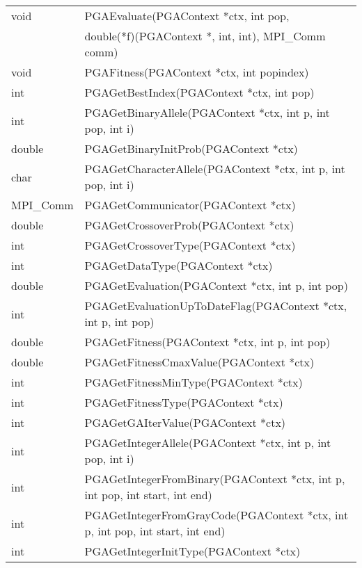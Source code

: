 \documentclass{report}
\begin{document}
\begin{tabular}{|l|l|}
void &  PGAEvaluate(PGAContext *ctx, int pop, \\ 
     & double(*f)(PGAContext *, int, int), MPI\_Comm comm) \\ \hline
void &  PGAFitness(PGAContext *ctx, int popindex) \\ \hline
int &  PGAGetBestIndex(PGAContext *ctx, int pop) \\ \hline
int &  PGAGetBinaryAllele(PGAContext *ctx, int p, int pop, int i) \\ \hline
double &  PGAGetBinaryInitProb(PGAContext *ctx) \\ \hline
char &  PGAGetCharacterAllele(PGAContext *ctx, int p, int pop, int i) \\ \hline
MPI\_Comm & PGAGetCommunicator(PGAContext *ctx) \\ \hline
double &  PGAGetCrossoverProb(PGAContext *ctx) \\ \hline
int &  PGAGetCrossoverType(PGAContext *ctx) \\ \hline
int &  PGAGetDataType(PGAContext *ctx) \\ \hline
double &  PGAGetEvaluation(PGAContext *ctx, int p, int pop) \\ \hline
int &  PGAGetEvaluationUpToDateFlag(PGAContext *ctx, int p, int pop) \\ \hline
double &  PGAGetFitness(PGAContext *ctx, int p, int pop) \\ \hline
double &  PGAGetFitnessCmaxValue(PGAContext *ctx) \\ \hline
int &  PGAGetFitnessMinType(PGAContext *ctx) \\ \hline
int &  PGAGetFitnessType(PGAContext *ctx) \\ \hline
int &  PGAGetGAIterValue(PGAContext *ctx) \\ \hline
int &  PGAGetIntegerAllele(PGAContext *ctx, int p, int pop, int i) \\ \hline
int &  PGAGetIntegerFromBinary(PGAContext *ctx, int p, int pop, int start, int
end) \\ \hline
int &  PGAGetIntegerFromGrayCode(PGAContext *ctx, int p, int pop, int start,
int end) \\ \hline
int &  PGAGetIntegerInitType(PGAContext *ctx) \\ \hline
\end{tabular}
\end{document}

